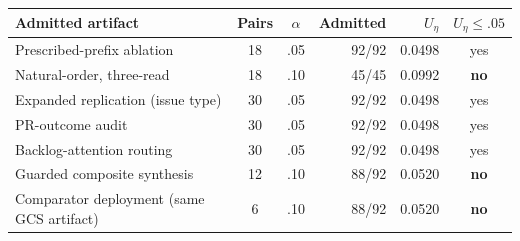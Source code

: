 \begin{tabularx}{\linewidth}{@{}>{\raggedright\arraybackslash}X c c r r c@{}}
\toprule
Admitted artifact & Pairs & $\alpha$ & Admitted & $U_\eta$ & $U_\eta\!\leq\!.05$ \\
\midrule
Prescribed-prefix ablation & 18 & .05 & 92/92 & 0.0498 & yes \\
Natural-order, three-read & 18 & .10 & 45/45 & 0.0992 & \textbf{no} \\
Expanded replication (issue type) & 30 & .05 & 92/92 & 0.0498 & yes \\
PR-outcome audit & 30 & .05 & 92/92 & 0.0498 & yes \\
Backlog-attention routing & 30 & .05 & 92/92 & 0.0498 & yes \\
Guarded composite synthesis & 12 & .10 & 88/92 & 0.0520 & \textbf{no} \\
Comparator deployment (same GCS artifact) & 6 & .10 & 88/92 & 0.0520 & \textbf{no} \\
\bottomrule
\end{tabularx}
